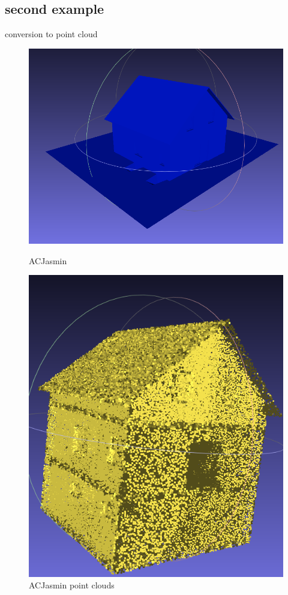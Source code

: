 \documentclass[10pt]{beamer}
\begin{document}
\subsection*{second example}
\begin{frame}{conversion to point cloud }
    \begin{figure}[H]
        \centering
        \begin{minipage}[t]{0.40\textwidth}
          \includegraphics[width=\textwidth]{../../images/screen_kinetic/ACJasmin.png}
          \caption*{ACJasmin}
        \end{minipage}
        \begin{minipage}[t]{0.35\textwidth}
            \includegraphics[width=\textwidth]{../../images/screen_kinetic/ACJasmin_point_cloud.png}
            \caption*{ACJasmin point clouds}
          \end{minipage}
      \end{figure}  
\end{frame}
\end{document}
